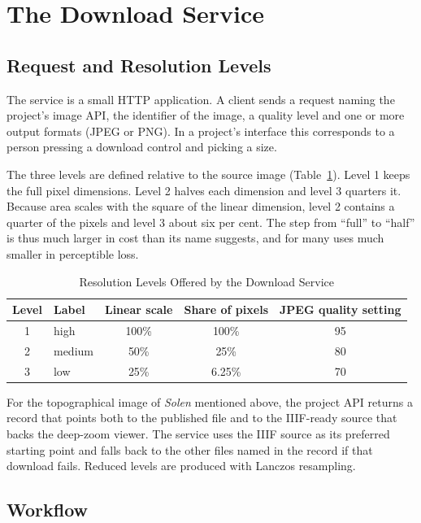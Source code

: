 \documentclass{dhnbpub}
\begin{document}
\section{The Download Service}

\subsection{Request and Resolution Levels}

The service is a small HTTP application. A client sends a request
naming the project's image API, the identifier of the image, a quality
level and one or more output formats (JPEG or PNG). In a project's
interface this corresponds to a person pressing a download control and
picking a size.

The three levels are defined relative to the source image
(Table~\ref{tab:levels}). Level 1 keeps the full pixel dimensions.
Level 2 halves each dimension and level 3 quarters it. Because area
scales with the square of the linear dimension, level 2 contains a
quarter of the pixels and level 3 about six per cent. The step from
``full'' to ``half'' is thus much larger in cost than its name
suggests, and for many uses much smaller in perceptible loss.

\begin{table}
  \caption{Resolution Levels Offered by the Download Service}
  \label{tab:levels}
  \begin{tabular}{clccc}
    \toprule
    Level & Label & Linear scale & Share of pixels & JPEG quality setting\\
    \midrule
    1 & high   & 100\% & 100\%   & 95\\
    2 & medium & 50\%  & 25\%    & 80\\
    3 & low    & 25\%  & 6.25\%  & 70\\
    \bottomrule
  \end{tabular}
\end{table}

For the topographical image of \emph{Solen} mentioned above, the
project API returns a record that points both to the published file and
to the IIIF-ready source that backs the deep-zoom viewer. The service
uses the IIIF source as its preferred starting point and falls back to
the other files named in the record if that download fails. Reduced
levels are produced with Lanczos resampling.

\subsection{Workflow}
\end{document}
